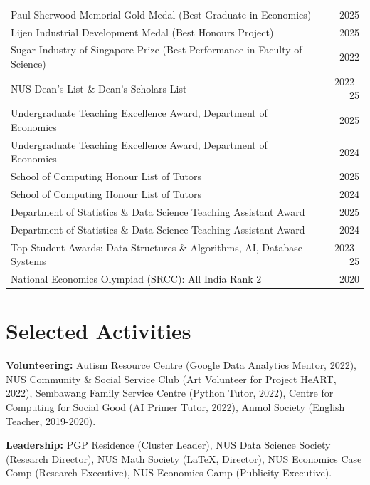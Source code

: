 \documentclass[10pt,a4paper]{article}
\begin{document}
\begin{tabularx}{\textwidth}{@{}X r@{}}
Paul Sherwood Memorial Gold Medal (Best Graduate in Economics) & 2025 \\
Lijen Industrial Development Medal (Best Honours Project) & 2025 \\
Sugar Industry of Singapore Prize (Best Performance in Faculty of Science) & 2022 \\
NUS Dean's List \& Dean's Scholars List & 2022--25 \\
Undergraduate Teaching Excellence Award, Department of Economics & 2025 \\
Undergraduate Teaching Excellence Award, Department of Economics & 2024 \\
School of Computing Honour List of Tutors & 2025 \\
School of Computing Honour List of Tutors & 2024 \\
Department of Statistics \& Data Science Teaching Assistant Award & 2025 \\
Department of Statistics \& Data Science Teaching Assistant Award & 2024 \\
Top Student Awards: Data Structures \& Algorithms, AI, Database Systems &  2023--25\\
National Economics Olympiad (SRCC): All India Rank 2 & 2020 \\
\end{tabularx}

\section{Selected Activities}

\textbf{Volunteering:} Autism Resource Centre (Google Data Analytics Mentor, 2022), NUS Community \& Social Service Club (Art
Volunteer for Project HeART, 2022), Sembawang Family Service Centre (Python Tutor, 2022), Centre for Computing for Social Good (AI Primer Tutor, 2022), Anmol Society (English Teacher, 2019-2020).

\vspace{3pt}

\textbf{Leadership:} PGP Residence (Cluster Leader), NUS Data Science Society (Research Director), NUS Math Society (\LaTeX, Director), NUS Economics Case Comp (Research Executive), NUS Economics Camp (Publicity Executive).

\vspace{3pt}
\end{document}
